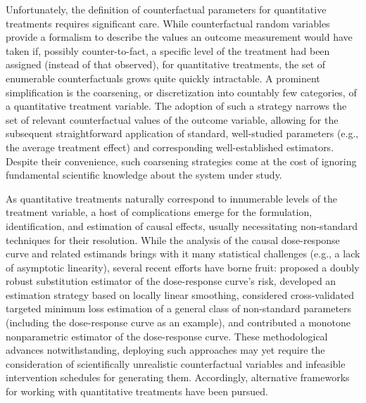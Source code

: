 Unfortunately, the definition of counterfactual parameters for quantitative
treatments requires significant care. While counterfactual random variables
provide a formalism to describe the values an outcome measurement would have
taken if, possibly counter-to-fact, a specific level of the treatment had been
assigned (instead of that observed), for quantitative treatments, the set of
enumerable counterfactuals grows quite quickly intractable. A prominent
simplification is the coarsening, or discretization into countably few
categories, of a quantitative treatment variable. The adoption of such
a strategy narrows the set of relevant counterfactual values of the outcome
variable, allowing for the subsequent straightforward application of standard,
well-studied parameters (e.g., the average treatment effect) and corresponding
well-established estimators. Despite their convenience, such coarsening
strategies come at the cost of ignoring fundamental scientific knowledge about
the system under study.

As quantitative treatments naturally correspond to innumerable levels of the
treatment variable, a host of complications emerge for the formulation,
identification, and estimation of causal effects, usually necessitating
non-standard techniques for their resolution. While the analysis of the causal
dose-response curve and related estimands brings with it many statistical
challenges (e.g., a lack of asymptotic linearity), several recent efforts have
borne fruit: \citet{diaz2013targeted} proposed a doubly robust substitution
estimator of the dose-response curve's risk, \citet{kennedy2017nonparametric}
developed an estimation strategy based on locally linear smoothing,
\citet{vdl2018cvtmle} considered cross-validated targeted minimum loss
estimation of a general class of non-standard parameters (including the
dose-response curve as an example), and \citet{westling2020causal} contributed
a monotone nonparametric estimator of the dose-response curve. These
methodological advances notwithstanding, deploying such approaches may yet
require the consideration of scientifically unrealistic counterfactual variables
and infeasible intervention schedules for generating them. Accordingly,
alternative frameworks for working with quantitative treatments have been
pursued.

